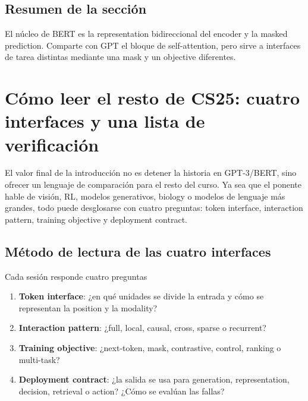 \documentclass[a4paper]{article}
\begin{document}
\subsection{Resumen de la sección}

El núcleo de BERT es la representation bidireccional del encoder y la masked prediction. Comparte con GPT el bloque de self-attention, pero sirve a interfaces de tarea distintas mediante una mask y un objective diferentes.
\section{Cómo leer el resto de CS25: cuatro interfaces y una lista de verificación}

El valor final de la introducción no es detener la historia en GPT-3/BERT, sino ofrecer un lenguaje de comparación para el resto del curso. Ya sea que el ponente hable de visión, RL, modelos generativos, biology o modelos de lenguaje más grandes, todo puede desglosarse con cuatro preguntas: token interface, interaction pattern, training objective y deployment contract.

\subsection{Método de lectura de las cuatro interfaces}

\begin{importantbox}{Cada sesión responde cuatro preguntas}
\begin{enumerate}
  \item \textbf{Token interface}: ¿en qué unidades se divide la entrada y cómo se representan la position y la modality?
  \item \textbf{Interaction pattern}: ¿full, local, causal, cross, sparse o recurrent?
  \item \textbf{Training objective}: ¿next-token, mask, contrastive, control, ranking o multi-task?
  \item \textbf{Deployment contract}: ¿la salida se usa para generation, representation, decision, retrieval o action? ¿Cómo se evalúan las fallas?
\end{enumerate}
\end{importantbox}

\end{document}
